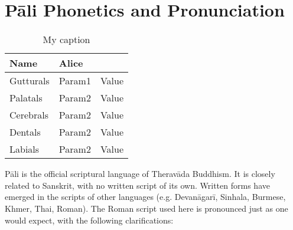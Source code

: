\section{Pāli Phonetics and Pronunciation}
\label{phonetics}




\begin{table}[]
\centering
\caption{My caption}
\label{my-label}
\begin{tabular}{|l|l|l|}
\hline
Name       & \multicolumn{2}{l|}{Alice}  \\ \hline
Gutturals  & Param1        & Value       \\ \hline%
Palatals   & Param2        & Value       \\ \hline%
Cerebrals  & Param2        & Value       \\ \hline
Dentals    & Param2        & Value       \\ \hline
Labials    & Param2        & Value       \\ \hline
\end{tabular}
\end{table}

\begin{justify}
  Pāli is the official scriptural language of Theravāda Buddhism. It is closely related to Sanskrit, with no written script of its own. Written forms have emerged in the scripts of other languages (e.g. Devanāgarī, Sinhala, Burmese, Khmer, Thai, Roman). The Roman script used here is pronounced just as one would expect, with the following clarifications:
\end{justify}

